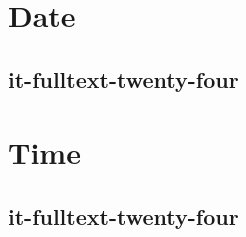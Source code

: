 \documentclass[italian]{article}
\begin{document}
	\section{Date}
	\subsection{it-fulltext-twenty-four}
	
	\section{Time}
	\subsection{it-fulltext-twenty-four}
	
\end{document}
